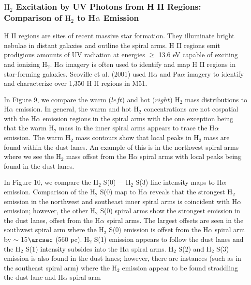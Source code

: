 \documentclass[manuscript]{aastex}
\begin{document}
\subsubsection{$\mathrm{H_2}$ Excitation by UV Photons from H II Regions: Comparison of $\mathrm{H_2}$ to H$\alpha$ Emission}

H II regions are sites of recent massive star formation.  They illuminate bright nebulae in distant galaxies and outline the spiral arms.  H II regions emit prodigious amounts of UV radiation at energies $\ge$ 13.6 eV capable of exciting and ionizing $\mathrm{H_2}$.  H$\alpha$ imagery is often used to identify and map H II regions in star-forming galaxies.  Scoville et al. (2001) used H$\alpha$ and Pa$\alpha$ imagery to identify and characterize over 1,350 H II regions in M51.  

In Figure 9, we compare the warm ($left$) and hot ($right$) $\mathrm{H_2}$ mass distributions to H$\alpha$ emission.  In general, the warm and hot $\mathrm{H_2}$ concentrations are not cospatial with the H$\alpha$ emission regions in the spiral arms with the one exception being that the warm $\mathrm{H_2}$ mass in the inner spiral arms appears to trace the H$\alpha$ emission.  The warm $\mathrm{H_2}$ mass contours show that local peaks in $\mathrm{H_2}$ mass are found within the dust lanes.  An example of this is in the northwest spiral arms where we see the $\mathrm{H_2}$ mass offset from the H$\alpha$ spiral arms with local peaks being found in the dust lanes.

In Figure 10, we compare the $\mathrm{H_2}$ S(0) $-$ $\mathrm{H_2}$ S(3) line intensity maps to H$\alpha$ emission.  Comparison of the $\mathrm{H_2}$ S(0) map to H$\alpha$ reveals that the strongest $\mathrm{H_2}$ emission in the northwest and southeast inner spiral arms is coincident with H$\alpha$ emission; however, the other $\mathrm{H_2}$ S(0) spiral arms  show the strongest emission in the dust lanes, offset from the H$\alpha$ spiral arms.  The largest offsets are seen in the southwest spiral arm where the $\mathrm{H_2}$ S(0) emission is offset from the H$\alpha$ spiral arm by $\sim$ 15$\arcsec$ (560 pc).  $\mathrm{H_2}$ S(1) emission appears to follow the dust lanes and the $\mathrm{H_2}$ S(1) intensity subsides into the H$\alpha$ spiral arms.  $\mathrm{H_2}$ S(2) and $\mathrm{H_2}$ S(3) emission is also found in the dust lanes; however, there are instances (such as in the southeast spiral arm) where the $\mathrm{H_2}$ emission appear to be found straddling the dust lane and H$\alpha$ spiral arm.
\end{document}
